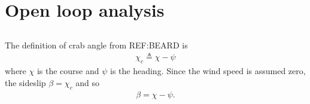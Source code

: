 \section{Open loop analysis}

\subsection{}
The definition of crab angle from REF:BEARD is
\begin{equation}\begin{aligned}
\chi_c \triangleq \chi - \psi
\end{aligned}\end{equation}
where $\chi$ is the course and $\psi$ is the heading. Since the wind speed is assumed zero, the sideslip $\beta = \chi_c$ and so
\begin{equation}\begin{aligned}
\beta = \chi - \psi.
\end{aligned}\end{equation}

